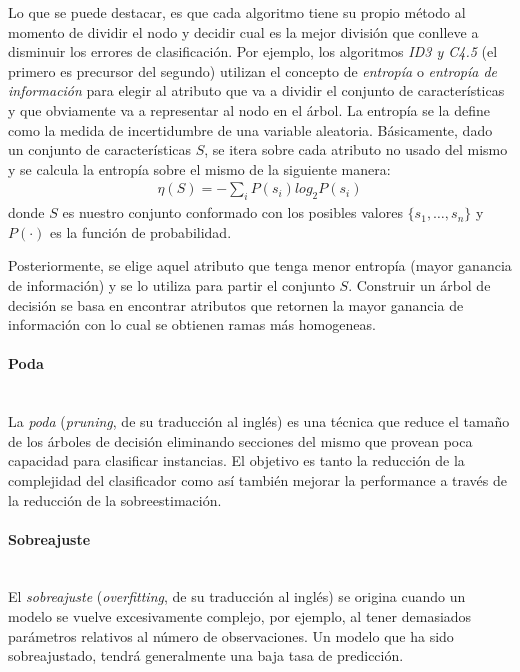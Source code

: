 	Lo que se puede destacar, es que cada algoritmo tiene su propio método al momento de dividir el nodo y decidir cual es la mejor división que conlleve a disminuir los errores de clasificación. Por ejemplo, los algoritmos \textit{ID3 y C4.5} \cite{QuinlanID3, QuinlanC45} (el primero es precursor del segundo)  utilizan el concepto de \textit{entropía} o \textit{entropía de información} para elegir al atributo que va a dividir el conjunto de características y que obviamente va a representar al nodo en el árbol. La entropía se la define como la medida de incertidumbre de una variable aleatoria.  Básicamente, dado un conjunto de características $S$, se itera sobre cada atributo no usado del mismo y se calcula la entropía sobre el mismo de la siguiente manera:
	\begin{align}
		\eta(S) = -\sum_i P(s_i)log_{2}P(s_i)
	\end{align}
	donde $S$ es nuestro conjunto conformado con los posibles valores $\{ s_1,\dots, s_n \}$ y $P( \cdot )$ es la función de probabilidad.
	
	Posteriormente, se elige aquel atributo que tenga menor entropía (mayor ganancia de información) y se lo utiliza para partir el conjunto $S$. Construir un árbol de decisión se basa en encontrar atributos que retornen la mayor ganancia de información con lo cual se obtienen ramas más homogeneas.
	
	\paragraph{Poda} ~\\
	
		La \textit{poda} (\textit{pruning}, de su traducción al inglés) es una técnica que reduce el tamaño de los árboles de decisión eliminando secciones del mismo que provean poca capacidad para clasificar instancias. El objetivo es tanto la reducción de la complejidad del clasificador como así también mejorar la performance a través de la reducción de la sobreestimación.
	
	\paragraph{Sobreajuste} ~\\
	
		El \textit{sobreajuste} (\textit{overfitting}, de su traducción al inglés) se origina cuando un modelo se vuelve excesivamente complejo, por ejemplo, al tener demasiados parámetros relativos al número de observaciones. Un modelo que ha sido sobreajustado, tendrá generalmente una baja tasa de predicción.

